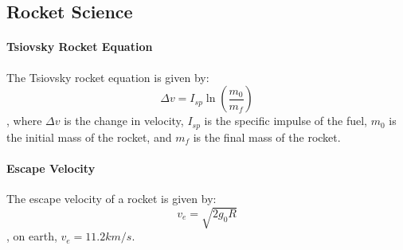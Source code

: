 \documentclass[11pt]{article}
\begin{document}
\subsection{Rocket Science}
\paragraph{Tsiovsky Rocket Equation} The Tsiovsky rocket equation is given by:
\begin{equation}
    \Delta v = I_{sp} \ln \left( \frac{m_0}{m_f} \right)
\end{equation}
, where $\Delta v$ is the change in velocity, $I_{sp}$ is the specific impulse of the fuel, $m_0$ is the initial mass of the rocket, and $m_f$ is the final mass of the rocket.
\paragraph{Escape Velocity} The escape velocity of a rocket is given by:
\begin{equation}
    v_e = \sqrt{2g_0R}
\end{equation}
, on earth, $v_e = 11.2 km/s$.
\end{document}
